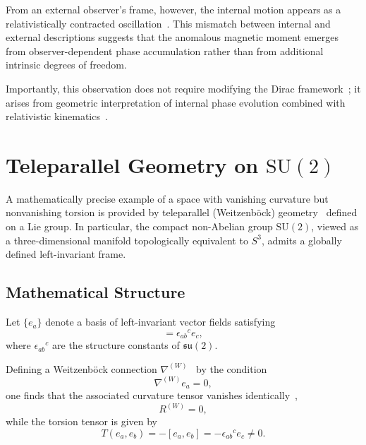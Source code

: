 \documentclass[12pt,letterpaper]{article}
\begin{document}
From an external observer's frame, however, the internal motion appears as a relativistically contracted oscillation~\cite{hanamura17765409}. This mismatch between internal and external descriptions suggests that the anomalous magnetic moment emerges from observer-dependent phase accumulation rather than from additional intrinsic degrees of freedom.

Importantly, this observation does not require modifying the Dirac framework~\cite{Dirac1928}; it arises from geometric interpretation of internal phase evolution combined with relativistic kinematics~\cite{hanamura17765409}.


\section{Teleparallel Geometry on $\mathrm{SU}(2)$}

\justifying
A mathematically precise example of a space with vanishing curvature but nonvanishing torsion is provided by teleparallel (Weitzenb\"{o}ck) geometry~\cite{Weitzenbock1923,Aldrovandi2013} defined on a Lie group. In particular, the compact non-Abelian group $\mathrm{SU}(2)$, viewed as a three-dimensional manifold topologically equivalent to $S^{3}$, admits a globally defined left-invariant frame.

\subsection{Mathematical Structure}

Let $\{e_{a}\}$ denote a basis of left-invariant vector fields satisfying
\begin{equation}
[e_{a}, e_{b}] = \epsilon_{ab}{}^{c} e_{c},
\end{equation}
where $\epsilon_{ab}{}^{c}$ are the structure constants of $\mathfrak{su}(2)$.

Defining a Weitzenb\"{o}ck connection $\nabla^{(W)}$~\cite{Weitzenbock1923} by the condition
\begin{equation}
\nabla^{(W)} e_{a} = 0,
\end{equation}
one finds that the associated curvature tensor vanishes identically~\cite{Aldrovandi2013},
\begin{equation}
R^{(W)} = 0,
\end{equation}
while the torsion tensor is given by
\begin{equation}
T(e_{a}, e_{b}) = -[e_{a}, e_{b}] = -\epsilon_{ab}{}^{c} e_{c} \neq 0.
\end{equation}
\end{document}
